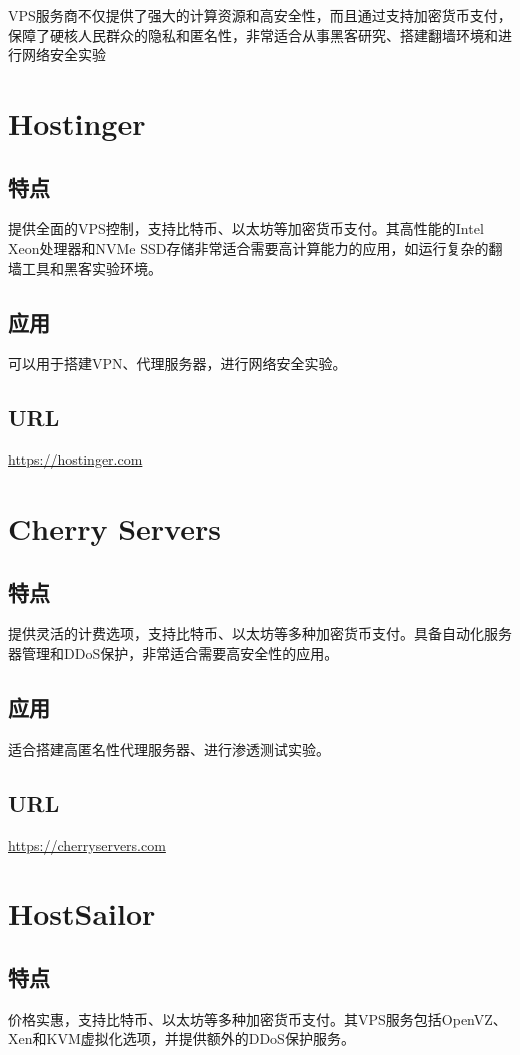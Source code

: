 \documentclass[11pt]{article}
\date{\today}
\title{}
\begin{document}
\tableofcontents

VPS服务商不仅提供了强大的计算资源和高安全性，而且通过支持加密货币支付，保障了硬核人民群众的隐私和匿名性，非常适合从事黑客研究、搭建翻墙环境和进行网络安全实验
\section{Hostinger}
\label{sec:org5ee7474}
\subsection{特点}
\label{sec:org78115fe}
提供全面的VPS控制，支持比特币、以太坊等加密货币支付。其高性能的Intel Xeon处理器和NVMe SSD存储非常适合需要高计算能力的应用，如运行复杂的翻墙工具和黑客实验环境。
\subsection{应用}
\label{sec:org3b9ad12}
可以用于搭建VPN、代理服务器，进行网络安全实验。
\subsection{URL}
\label{sec:org7d82852}
\url{https://hostinger.com}

\section{Cherry Servers}
\label{sec:orgad379fa}
\subsection{特点}
\label{sec:orga00de01}
提供灵活的计费选项，支持比特币、以太坊等多种加密货币支付。具备自动化服务器管理和DDoS保护，非常适合需要高安全性的应用。
\subsection{应用}
\label{sec:orgad9a2f6}
适合搭建高匿名性代理服务器、进行渗透测试实验。
\subsection{URL}
\label{sec:orgb02f060}
\url{https://cherryservers.com}

\section{HostSailor}
\label{sec:orgb7717f4}
\subsection{特点}
\label{sec:org551d92e}
价格实惠，支持比特币、以太坊等多种加密货币支付。其VPS服务包括OpenVZ、Xen和KVM虚拟化选项，并提供额外的DDoS保护服务。
\end{document}
